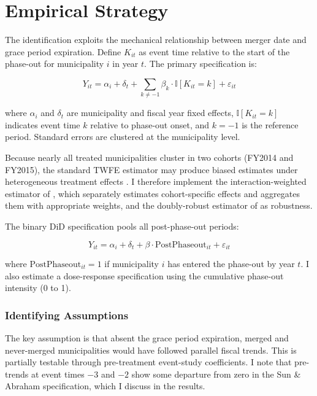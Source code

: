 \documentclass[12pt]{article}
\newcommand{\ind}{\mathbb{I}}
\begin{document}
\section{Empirical Strategy}

The identification exploits the mechanical relationship between merger date and grace period expiration. Define $K_{it}$ as event time relative to the start of the phase-out for municipality $i$ in year $t$. The primary specification is:

\begin{equation}
Y_{it} = \alpha_i + \delta_t + \sum_{k \neq -1} \beta_k \cdot \ind[K_{it} = k] + \varepsilon_{it}
\label{eq:event_study}
\end{equation}

\noindent where $\alpha_i$ and $\delta_t$ are municipality and fiscal year fixed effects, $\ind[K_{it} = k]$ indicates event time $k$ relative to phase-out onset, and $k = -1$ is the reference period. Standard errors are clustered at the municipality level.

Because nearly all treated municipalities cluster in two cohorts (FY2014 and FY2015), the standard TWFE estimator may produce biased estimates under heterogeneous treatment effects \citep{dechaisemartin2020, goodman2021}. I therefore implement the interaction-weighted estimator of \citet{sun2021}, which separately estimates cohort-specific effects and aggregates them with appropriate weights, and the doubly-robust estimator of \citet{callaway2021} as robustness.

The binary DiD specification pools all post-phase-out periods:

\begin{equation}
Y_{it} = \alpha_i + \delta_t + \beta \cdot \text{PostPhaseout}_{it} + \varepsilon_{it}
\label{eq:binary_did}
\end{equation}

\noindent where $\text{PostPhaseout}_{it} = 1$ if municipality $i$ has entered the phase-out by year $t$. I also estimate a dose-response specification using the cumulative phase-out intensity (0 to 1).

\subsubsection*{Identifying Assumptions} The key assumption is that absent the grace period expiration, merged and never-merged municipalities would have followed parallel fiscal trends. This is partially testable through pre-treatment event-study coefficients. I note that pre-trends at event times $-3$ and $-2$ show some departure from zero in the Sun \& Abraham specification, which I discuss in the results.
\end{document}
